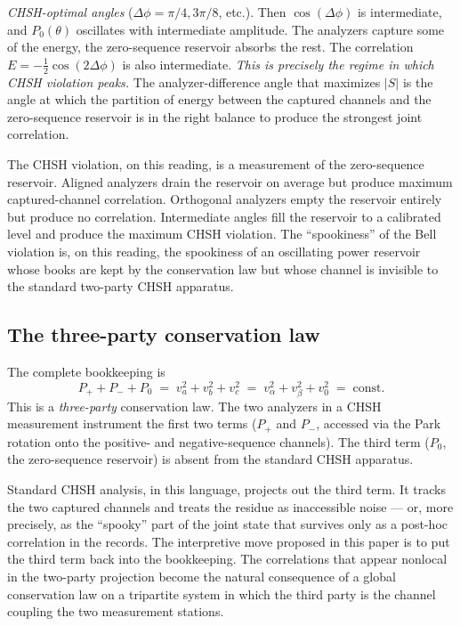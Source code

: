 \documentclass[
  11pt]{article}
\begin{document}
\emph{CHSH-optimal angles} (\(\Delta\phi = \pi/4, 3\pi/8\), etc.). Then
\(\cos(\Delta\phi)\) is intermediate, and \(P_0(\theta)\) oscillates
with intermediate amplitude. The analyzers capture some of the energy,
the zero-sequence reservoir absorbs the rest. The correlation
\(E = -\tfrac{1}{2}\cos(2\Delta\phi)\) is also intermediate. \emph{This
is precisely the regime in which CHSH violation peaks.} The
analyzer-difference angle that maximizes \(|S|\) is the angle at which
the partition of energy between the captured channels and the
zero-sequence reservoir is in the right balance to produce the strongest
joint correlation.

The CHSH violation, on this reading, is a measurement of the
zero-sequence reservoir. Aligned analyzers drain the reservoir on
average but produce maximum captured-channel correlation. Orthogonal
analyzers empty the reservoir entirely but produce no correlation.
Intermediate angles fill the reservoir to a calibrated level and produce
the maximum CHSH violation. The ``spookiness'' of the Bell violation is,
on this reading, the spookiness of an oscillating power reservoir whose
books are kept by the conservation law but whose channel is invisible to
the standard two-party CHSH apparatus.

\subsection{The three-party conservation
law}\label{the-three-party-conservation-law}

The complete bookkeeping is \[
P_+ + P_- + P_0 \;=\; v_a^2 + v_b^2 + v_c^2 \;=\; v_\alpha^2 + v_\beta^2 + v_0^2 \;=\; \mathrm{const}.
\] This is a \emph{three-party} conservation law. The two analyzers in a
CHSH measurement instrument the first two terms (\(P_+\) and \(P_-\),
accessed via the Park rotation onto the positive- and negative-sequence
channels). The third term (\(P_0\), the zero-sequence reservoir) is
absent from the standard CHSH apparatus.

Standard CHSH analysis, in this language, projects out the third term.
It tracks the two captured channels and treats the residue as
inaccessible noise --- or, more precisely, as the ``spooky'' part of the
joint state that survives only as a post-hoc correlation in the records.
The interpretive move proposed in this paper is to put the third term
back into the bookkeeping. The correlations that appear nonlocal in the
two-party projection become the natural consequence of a global
conservation law on a tripartite system in which the third party is the
channel coupling the two measurement stations.
\end{document}
